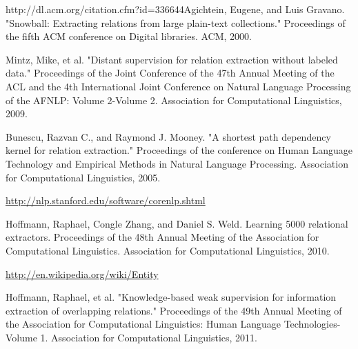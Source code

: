 \begin{thebibliography}{9}
 \label{snowball}
http://dl.acm.org/citation.cfm?id=336644Agichtein, Eugene, and Luis Gravano. "Snowball: Extracting relations from large plain-text collections." Proceedings of the fifth ACM conference on Digital libraries. ACM, 2000.
 
 \label{mintz}
Mintz, Mike, et al. "Distant supervision for relation extraction without labeled data." Proceedings of the Joint Conference of the 47th Annual Meeting of the ACL and the 4th International Joint Conference on Natural Language Processing of the AFNLP: Volume 2-Volume 2. Association for Computational Linguistics, 2009.
 
 \label{shortestpathdep}
Bunescu, Razvan C., and Raymond J. Mooney. "A shortest path dependency kernel for relation extraction." Proceedings of the conference on Human Language Technology and Empirical Methods in Natural Language Processing. Association for Computational Linguistics, 2005.
 
 \label{corenlp}
\url{http://nlp.stanford.edu/software/corenlp.shtml}
 
 \label{rel}
Hoffmann, Raphael, Congle Zhang, and Daniel S. Weld. Learning 5000 relational extractors. Proceedings of the 48th Annual Meeting of the Association for Computational Linguistics. Association for Computational Linguistics, 2010.

 \label{wikientity}
\url{http://en.wikipedia.org/wiki/Entity}

 \label{multir}
Hoffmann, Raphael, et al. "Knowledge-based weak supervision for information extraction of overlapping relations." Proceedings of the 49th Annual Meeting of the Association for Computational Linguistics: Human Language Technologies-Volume 1. Association for Computational Linguistics, 2011.
\end{thebibliography}
